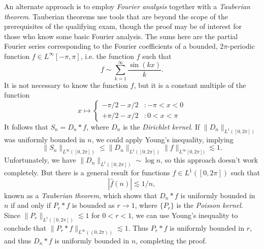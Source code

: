 \documentclass{exam}
\theoremstyle{problemstyle}
\newcommand{\1}[1]{\textbf{1}_{\left[#1\right]}} %
\begin{document}
\begin{questions}
\begin{solution}
An alternate approach is to employ \emph{Fourier analysis} together with a \emph{Tauberian theorem}. Tauberian theorems use tools that  are beyond the scope of the prerequisites of the qualifying exam, though the proof may be of interest for those who know some basic Fourier analysis. The sums here are the partial Fourier series corresponding to the Fourier coefficients of a bounded, $2 \pi$-periodic function $f \in L^\infty[-\pi,\pi]$, i.e. the function $f$ such that
%
\[ f \sim \sum_{k = 1}^\infty \frac{\sin(kx)}{k}. \]
%
It is not necessary to know the function $f$, but it is a constant multiple of the function
%
\[ x \mapsto \begin{cases} -\pi/2 - x/2 &: -\pi < x < 0 \\ +\pi/2 - x/2 &: 0 < x < \pi \end{cases} \]
%
It follows that $S_n = D_n * f$, where $D_n$ is the \emph{Dirichlet kernel}. If $\| D_n \|_{L^1([0,2\pi])}$ was uniformly bounded in $n$, we could apply Young's inequality, implying
%
\[ \| S_n \|_{L^\infty([0,2\pi])} \leq \| D_n \|_{L^1([0,2\pi])} \| f \|_{L^\infty[0,2\pi])} \lesssim 1. \]
%
Unfortunately, we have $\| D_n \|_{L^1([0,2\pi])} \sim \log n$, so this approach doesn't work completely. But there is a general result for functions $f \in L^1([0,2\pi])$ such that
%
\[ |\widehat{f}(n)| \lesssim 1/n, \]
%
known as a \emph{Tauberian theorem}, which shows that $D_n * f$ is uniformly bounded in $n$ if and only if $P_r * f$ is bounded as $r \to 1$, where $\{ P_r \}$ is the \emph{Poisson kernel}. Since $\| P_r \|_{L^1([0,2\pi])} \lesssim 1$ for $0 < r < 1$, we can use Young's inequality to conclude that $\| P_r * f \|_{L^\infty((0,2\pi))} \lesssim 1$. Thus $P_r * f$ is uniformly bounded in $r$, and thus $D_n * f$ is uniformly bounded in $n$, completing the proof.

\end{solution}


\end{questions}
\end{document}
